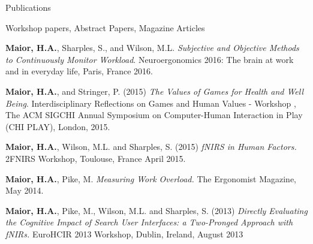 \documentclass{resume} %
\begin{document}
\begin{rSection}{Publications}
\begin{rSubsection}{ }{ }{ }{Workshop papers, Abstract Papers, Magazine Articles}
	\item \textbf{Maior, H.A.}, Sharples, S., and Wilson, M.L. \emph{Subjective and Objective Methods to Continuously Monitor Workload}. Neuroergonomics 2016: The brain at work and in everyday life, Paris, France 2016.
    \item \textbf{Maior, H.A.}, and Stringer, P. (2015) \emph{The Values of Games for Health and Well Being}. Interdisciplinary Reflections on Games and Human Values - Workshop , The ACM SIGCHI Annual Symposium on Computer-Human Interaction in Play (CHI PLAY), London, 2015.
    \item \textbf{Maior, H.A.}, Wilson, M.L. and Sharples, S. (2015) \emph{fNIRS in Human Factors.} 2FNIRS Workshop, Toulouse, France April 2015.
    \item \textbf{Maior, H.A.}, Pike, M. \emph{Measuring Work Overload.} The Ergonomist Magazine, May 2014.
    \item \textbf{Maior, H.A.}, Pike, M., Wilson, M.L. and Sharples, S. (2013) \emph{Directly Evaluating the Cognitive Impact of Search User Interfaces: a Two-Pronged Approach with fNIRs.} EuroHCIR 2013 Workshop, Dublin, Ireland, August 2013
\end{rSubsection}

\end{rSection}
\vspace{-2 mm}
\end{document}
